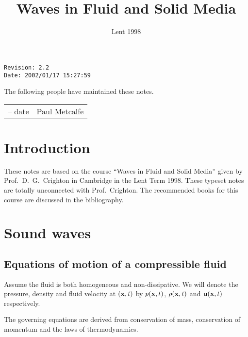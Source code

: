 \documentclass{notes}
\begin{document}
\frontmatter

\title{Waves in Fluid and Solid Media}

\date{Lent 1998} \maketitle

\thispagestyle{empty}

\noindent\verb$Revision: 2.2 $\hfill\\
\noindent\verb$Date: 2002/01/17 15:27:59 $\hfill

\vspace{1.5in}

The following people have maintained these notes.

\begin{center}
\begin{tabular}{ r  l}
-- date & Paul Metcalfe
\end{tabular}
\end{center}

\tableofcontents

\chapter{Introduction}

These notes are based on the course ``Waves in Fluid and Solid Media''
given by Prof.~D.~G.~Crighton in Cambridge in the Lent Term 1998.
These typeset notes are totally unconnected with Prof.~Crighton.  The
recommended books for this course are discussed in the bibliography.

\alsoavailable
\archimcopyright

\mainmatter

\chapter{Sound waves}

\section{Equations of motion of a compressible fluid}

Assume the fluid is both homogeneous and non-dissipative.  We will
denote the pressure, density and fluid velocity at $(\mathbf{x},t)$ by
$p(\mathbf{x},t)$, $\rho(\mathbf{x},t)$ and $\mathbf{u}(\mathbf{x},t)$ respectively.

The governing equations are derived from conservation of mass,
conservation of momentum and the laws of thermodynamics.
\end{document}
